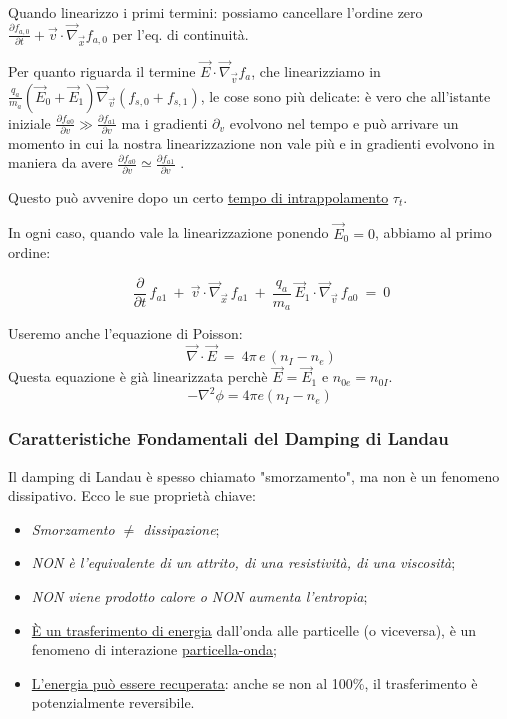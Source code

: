 Quando linearizzo i primi termini: possiamo cancellare l'ordine zero $\frac{\partial f_{a,0}}{\partial t} + \vec v\cdot \vec\nabla_{\vec x} f_{a,0}$ per l'eq. di continuità.

Per quanto riguarda il termine $\vec E\cdot \vec \nabla_{\vec v}f_a$, che linearizziamo in $\frac{q_a}{m_a} (\vec E_0 + \vec E_1)\vec \nabla_{\vec v} (f_{s,0}+f_{s,1})$, le cose sono più delicate:
è vero che all'istante iniziale $\displaystyle\frac{\partial f_{a0}}{\partial v}\gg\frac{\partial f_{a1}}{\partial v}$ ma i gradienti $\partial_v$ evolvono nel tempo e può arrivare un momento in cui la nostra linearizzazione non vale più e in gradienti evolvono in maniera da avere 
$\displaystyle\frac{\partial f_{a0}}{\partial v}\simeq\frac{\partial f_{a1}}{\partial v}$ .

Questo può avvenire dopo un certo \underline{tempo di intrappolamento} $\tau_t$.

In ogni caso, quando vale la linearizzazione ponendo $\vec E_0=0$, abbiamo al primo ordine:

\[\boxed{\ \frac{\partial}{\partial t}\,f_{a1}\ +\ \vec v\cdot \vec\nabla_{\vec x}\, f_{a1}\ +\ \frac{q_a}{m_a}\, \vec E_1\cdot \vec \nabla_{\vec v}\,f_{a0}\ =\ 0}\] 

Useremo anche l'equazione di Poisson:
\[\boxed{\ \vec \nabla\cdot\vec E\ =\ 4\pi\, e\,(n_I-n_e)}\] 
Questa equazione è già linearizzata perchè $\vec E=\vec E_1$ e $n_{0e}=n_{0I}$.
\[-\nabla^2\phi=4\pi e(n_I-n_e)\]

\subsubsection{Caratteristiche Fondamentali del Damping di Landau}
Il damping di Landau è spesso chiamato "smorzamento", ma non è un fenomeno dissipativo. Ecco le sue proprietà chiave:
\begin{itemize}
	\item \textit{Smorzamento $\neq$ dissipazione};
	\item \textit{NON è l'equivalente di un attrito, di una resistività, di una viscosità};
	\item \textit{NON viene prodotto calore o NON aumenta l'entropia};
	\item \underline{È un trasferimento di energia} dall'onda alle particelle (o viceversa), è un fenomeno di interazione \underline{particella-onda};
	\item \underline{L'energia può essere recuperata}: anche se non al 100\%, il trasferimento è potenzialmente reversibile.
\end{itemize}


